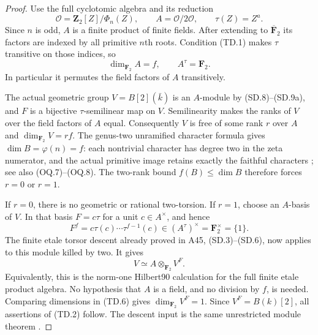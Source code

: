 \documentclass[11pt,a4paper]{article}
\begin{document}
\begin{proof}
Use the full cyclotomic algebra and its reduction
\[
 \mathcal O=\mathbf Z_2[Z]/\Phi_n(Z),\qquad
 A=\mathcal O/2\mathcal O,\qquad \tau(Z)=Z^a.
 \tag{TD.3}
\]
Since $n$ is odd, $A$ is a finite product of finite fields.
After extending to $\overline{\mathbf F}_2$ its factors are
indexed by all primitive $n$th roots. Condition (TD.1) makes
$\tau$ transitive on those indices, so
\[
              \dim_{\mathbf F_2}A=f,\qquad A^\tau=\mathbf F_2.
 \tag{TD.4}
\]
In particular it permutes the field factors of $A$ transitively.

The actual geometric group $V=B[2](\bar k)$ is an $A$-module
by (SD.8)--(SD.9a), and $F$ is a bijective
$\tau$-semilinear map on $V$.
Semilinearity makes the ranks of $V$ over the field factors
of $A$ equal. Consequently $V$ is free of some rank $r$ over
$A$ and $\dim_{\mathbf F_2}V=rf$.
The genus-two unramified character formula gives
$\dim B=\varphi(n)=f$: each nontrivial character has degree
two in the zeta numerator, and the actual primitive image
retains exactly the faithful characters
\cite[B.2]{A1run}; see also (OQ.7)--(OQ.8).
The two-rank bound $f(B)\le\dim B$
\cite[Remark~8.5, the bound $r\le g$]{MilneAV}
therefore forces $r=0$ or $r=1$.

If $r=0$, there is no geometric or rational two-torsion.
If $r=1$, choose an $A$-basis of $V$. In that basis
$F=c\tau$ for a unit $c\in A^\times$, and hence
\[
 F^f=c\tau(c)\cdots\tau^{f-1}(c)
                         \in(A^\tau)^\times=\mathbf F_2^\times=
                         \{1\}.
 \tag{TD.5}
\]
The finite etale torsor descent already proved in A45,
(SD.3)--(SD.6), now applies to this module killed by two.
It gives
\[
                  V\simeq A\otimes_{\mathbf F_2}V^F.
 \tag{TD.6}
\]
Equivalently, this is the norm-one Hilbert90 calculation for
the full finite etale product algebra. No hypothesis that
$A$ is a field, and no division by $f$, is needed.
Comparing dimensions in (TD.6) gives
$\dim_{\mathbf F_2}V^F=1$.
Since $V^F=B(k)[2]$, all assertions of (TD.2) follow.
The descent input is the same unrestricted module theorem
\cite[Proposition~35.3.9, Tag~\texttt{023N}]{Stacks023N}.
\end{proof}
\end{document}
